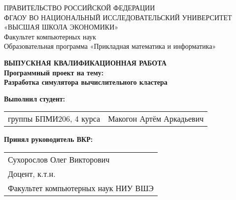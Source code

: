 \begin{titlepage}
  \newpage
  
  {
  \begin{center}
  ПРАВИТЕЛЬСТВО РОССИЙСКОЙ ФЕДЕРАЦИИ\\
  ФГАОУ ВО НАЦИОНАЛЬНЫЙ ИССЛЕДОВАТЕЛЬСКИЙ УНИВЕРСИТЕТ\\
  «ВЫСШАЯ ШКОЛА ЭКОНОМИКИ»
  \\
  \bigskip
  Факультет компьютерных наук\\
  Образовательная программа «Прикладная математика и информатика»
  \end{center}
  }
  
  \vspace{7em}
  
  \begin{center}
  {\bf ВЫПУСКНАЯ КВАЛИФИКАЦИОННАЯ РАБОТА}\\
  {\bf Программный проект на тему:}\\
  {\bf Разработка симулятора вычислительного кластера}\\
  \end{center}
  
  \vspace{2em}
  
  {\bf Выполнил студент: \vspace{2mm}}
  
  {
  \begin{tabular}{l@{\hskip 1.5cm}l}
  группы БПМИ206, 4 курса & Макогон Артём Аркадьевич 
  \end{tabular}}
  
  
  \vspace{1em}
  {\bf Принял руководитель ВКР: \vspace{2mm}}
  
  {
  \begin{tabular}{l}
  Сухорослов Олег Викторович\\
  Доцент, к.т.н. \\
  Факультет компьютерных наук НИУ ВШЭ 
  \end{tabular}}
  

\end{titlepage}
